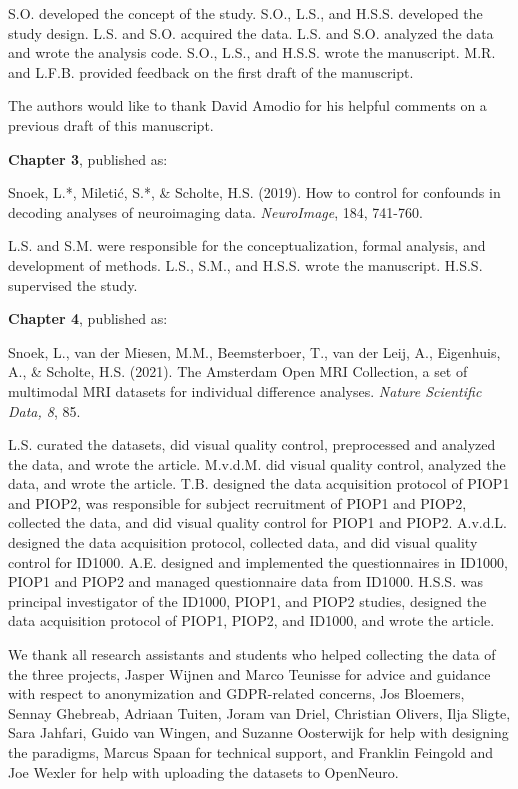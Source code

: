 \documentclass[11pt,american,a4paper,oneside,]{memoir} %
\begin{document}
S.O. developed the concept of the study. S.O., L.S., and H.S.S. developed the study design. L.S. and S.O. acquired the data. L.S. and S.O. analyzed the data and wrote the analysis code. S.O., L.S., and H.S.S. wrote the manuscript. M.R. and L.F.B. provided feedback on the first draft of the manuscript.

The authors would like to thank David Amodio for his helpful comments on a previous draft of this manuscript.

\textbf{Chapter 3}, published as:

Snoek, L.*, Miletić, S.*, \& Scholte, H.S. (2019). How to control for confounds in decoding analyses of neuroimaging data. \emph{NeuroImage}, 184, 741-760.

L.S. and S.M. were responsible for the conceptualization, formal analysis, and development of methods. L.S., S.M., and H.S.S. wrote the manuscript. H.S.S. supervised the study.

\textbf{Chapter 4}, published as:

Snoek, L., van der Miesen, M.M., Beemsterboer, T., van der Leij, A., Eigenhuis, A., \& Scholte, H.S. (2021). The Amsterdam Open MRI Collection, a set of multimodal MRI datasets for individual difference analyses. \emph{Nature Scientific Data, 8}, 85.

L.S. curated the datasets, did visual quality control, preprocessed and analyzed the data, and wrote the article. M.v.d.M. did visual quality control, analyzed the data, and wrote the article. T.B. designed the data acquisition protocol of PIOP1 and PIOP2, was responsible for subject recruitment of PIOP1 and PIOP2, collected the data, and did visual quality control for PIOP1 and PIOP2. A.v.d.L. designed the data acquisition protocol, collected data, and did visual quality control for ID1000. A.E. designed and implemented the questionnaires in ID1000, PIOP1 and PIOP2 and managed questionnaire data from ID1000. H.S.S. was principal investigator of the ID1000, PIOP1, and PIOP2 studies, designed the data acquisition protocol of PIOP1, PIOP2, and ID1000, and wrote the article.

We thank all research assistants and students who helped collecting the data of the three projects, Jasper Wijnen and Marco Teunisse for advice and guidance with respect to anonymization and GDPR-related concerns, Jos Bloemers, Sennay Ghebreab, Adriaan Tuiten, Joram van Driel, Christian Olivers, Ilja Sligte, Sara Jahfari, Guido van Wingen, and Suzanne Oosterwijk for help with designing the paradigms, Marcus Spaan for technical support, and Franklin Feingold and Joe Wexler for help with uploading the datasets to OpenNeuro.
\end{document}
